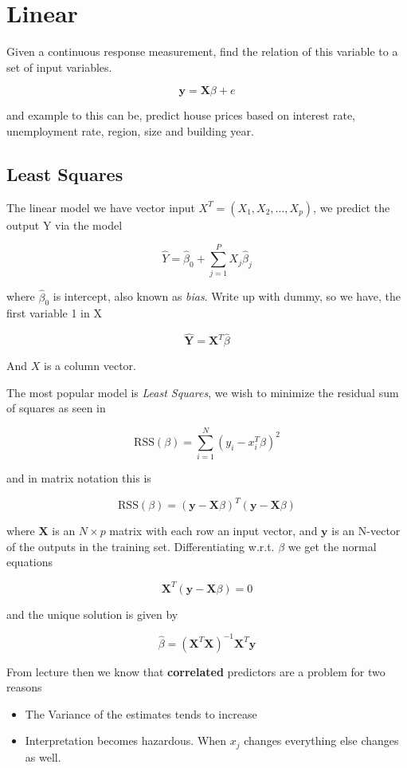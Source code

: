 \section{Linear}

Given a continuous response measurement, find the relation of this
variable to a set of input variables.

\[
    \bm{y} = \bm{X} \beta + e
\]

and example to this can be, predict house prices based on interest rate, unemployment rate, region, size and building year.

\subsection{Least Squares}

The linear model we have vector input $X^T = (X_1, X_2, ..., X_p)$, we predict the output Y via the model

\[
    \hat{Y} = \hat{\beta}_0 + \sum_{j=1}^{P} X_j \hat{\beta}_j
\]

where $\hat{\beta}_0$ is intercept, also known as \textit{bias}. Write up with dummy, so we have, the first variable 1 in X

\[
  \hat{\bm{Y}}   = \bm{X}^T \hat{\beta}
\]

And $X$ is a column vector.

The most popular model is \textit{Least Squares}, we wish to minimize the residual sum of squares as seen in \cite[p.~12]{friedman2016elements}

\[
    \text{RSS}(\beta) = \sum_{i=1}^{N} (y_i - x_i^T \beta)^2
\]

and in matrix notation this is

\[
    \text{RSS}(\beta) = (\bm{y} - \bm{X}\beta)^T (\bm{y} - \bm{X}\beta)
\]

where $\bm{X}$ is an $N \times p$ matrix with each row an input vector, and $\bm{y}$ is an N-vector of the outputs in the training set. Differentiating w.r.t. $\beta$ we get the normal equations

\[
    \bm{X}^T (\bm{y} - \bm{X} \beta) = 0
\]

and the unique solution is given by

\[
    \hat{\beta} = (\bm{X}^T \bm{X})^{-1} \bm{X}^T \bm{y}
\]

From lecture \cite[p.~40]{lecture1} then we know that \textbf{correlated} predictors are a problem for two reasons
\begin{itemize}
  \item The Variance of the estimates tends to increase
  \item Interpretation becomes hazardous. When $x_j$ changes everything else changes as well.
\end{itemize}

